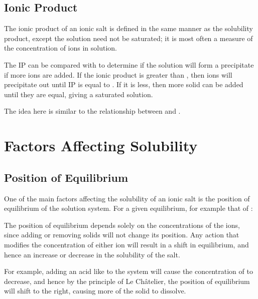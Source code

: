 
		\subsection{Ionic Product}

			The ionic product of an ionic salt is defined in the same manner as the solubility product, except the solution need not be
			saturated; it is most often a measure of the  concentration of ions in solution.

			The IP can be compared with \Ksp{} to determine if the solution will form a precipitate if more ions are added. If the ionic
			product is greater than \Ksp{}, then ions will precipitate out until IP is equal to \Ksp{}. If it is less, then more solid
			can be added until they are equal, giving a saturated solution.

			The idea here is similar to the relationship between \Qc{} and \Kc{}.




	\pagebreak
	\section{Factors Affecting Solubility}

		\subsection{Position of Equilibrium}

			One of the main factors affecting the solubility of an ionic salt is the position of equilibrium of the solution system. For a
			given equilibrium, for example that of :


			The position of equilibrium depends solely on the concentrations of the ions, since adding or removing solids will not change its
			position. Any action that modifies the concentration of either ion will result in a shift in equilibrium, and hence an increase or
			decrease in the solubility of the salt.

			For example, adding an acid like  to the system will cause the concentration of  to decrease, and hence by the
			principle of Le Châtelier, the position of equilibrium will shift to the right, causing more of the solid to dissolve.

